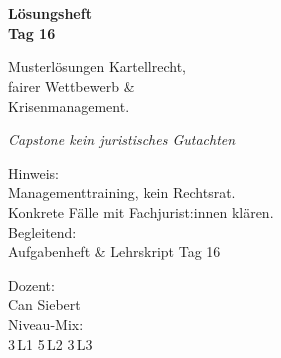 \documentclass[11pt,a4paper,oneside]{article}
\newcommand{\caveatfontfallback}{\itshape}
\newcommand\caveatfont{\caveatfontfallback}%
\begin{document}
\begin{titlepage}
  \pagestyle{empty}
  \vspace*{1.5cm}
  \\[2pt]
  \noindent{\color{lpAccent}\rule{\linewidth}{1.2pt}}\\[4pt]

  \vspace{3cm}
  {\sffamily\fontsize{30}{34}\selectfont\bfseries\color{lpInk}Lösungsheft\\Tag 16\par}

  \vspace{0.7cm}
  {\sffamily\large\color{lpGray}Musterlösungen \textendash{} Kartellrecht,\\fairer Wettbewerb \&\\Krisenmanagement.\par}

  \vspace{1.5cm}
  {\caveatfont\LARGE\color{lpGreen}Capstone \textperiodcentered{} kein juristisches Gutachten}\par

  \vfill

  \noindent\begin{minipage}{0.55\linewidth}
    {\sffamily\footnotesize\color{lpGray}Hinweis:}\\
    {\sffamily\small\color{lpInk}Managementtraining, kein Rechtsrat.\\Konkrete Fälle mit Fachjurist:innen klären.}\\[10pt]
    {\sffamily\footnotesize\color{lpGray}Begleitend:}\\
    {\sffamily\small\color{lpInk}Aufgabenheft \& Lehrskript Tag 16}
  \end{minipage}\hfill
  \begin{minipage}{0.4\linewidth}
    \raggedleft
    {\sffamily\footnotesize\color{lpGray}Dozent:}\\
    {\sffamily\small\color{lpInk}Can Siebert}\\[10pt]
    {\sffamily\footnotesize\color{lpGray}Niveau-Mix:}\\
    {\sffamily\small\color{lpInk}3\,L1 \textperiodcentered{} 5\,L2 \textperiodcentered{} 3\,L3}
  \end{minipage}

  \vspace{0.5cm}
  \noindent{\color{lpAccent}\rule{\linewidth}{0.6pt}}
\end{titlepage}
\end{document}
